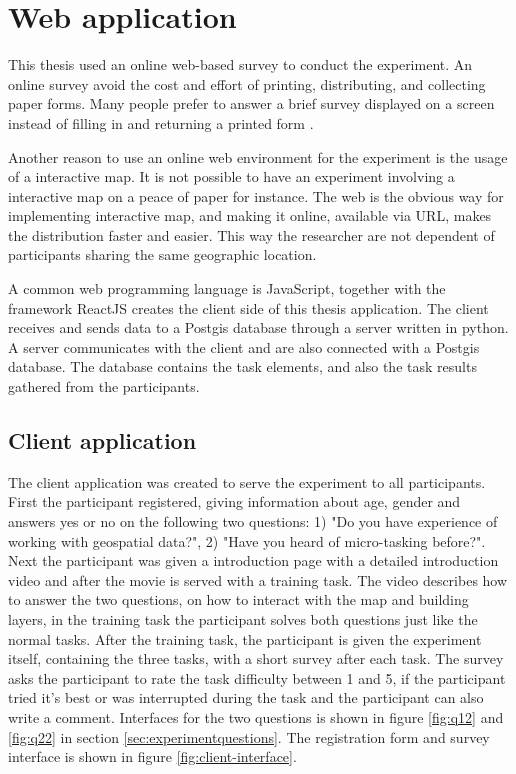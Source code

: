 \section{Web application}
This thesis used an online web-based survey to conduct the experiment. An online survey avoid the cost and effort of printing, distributing, and collecting paper forms. Many people prefer to answer a brief survey displayed on a screen instead of filling in and returning a printed form \citep{Ben2009}. 

Another reason to use an online web environment for the experiment is the usage of a interactive map. It is not possible to have an experiment involving a interactive map on a peace of paper for instance. The web is the obvious way for implementing interactive map, and making it online, available via URL, makes the distribution faster and easier. This way the researcher are not dependent of participants sharing the same geographic location. 

A common web programming language is JavaScript, together with the framework ReactJS creates the client side of this thesis application. The client receives and sends data to a Postgis database through a server written in python. A server communicates with the client and are also connected with a Postgis database. The database contains the task elements, and also the task results gathered from the participants.  
 
\subsection{Client application}
The client application was created to serve the experiment to all participants. First the participant registered, giving information about age, gender and answers yes or no on the following two questions: 1) "Do you have experience of working with geospatial data?", 2) "Have you heard of micro-tasking before?". Next the participant was given a introduction page with a detailed introduction video and after the movie is served with a training task. The video describes how to answer the two questions, on how to interact with the map and building layers, in the training task the participant solves both questions just like the normal tasks. After the training task, the participant is given the experiment itself, containing the three tasks, with a short survey after each task. The survey asks the participant to rate the task difficulty between 1 and 5, if the participant tried it's best or was interrupted during the task and the participant can also write a comment. Interfaces for the two questions is shown in figure \ref{fig:q12} and \ref{fig:q22} in section \ref{sec:experimentquestions}. The registration form and survey interface is shown in figure \ref{fig:client-interface}. 

